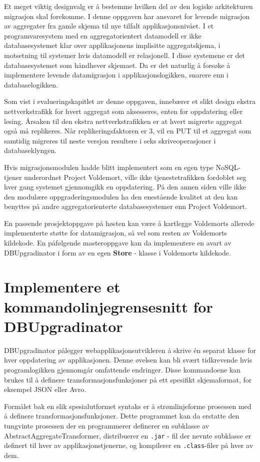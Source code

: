 Et meget viktig designvalg er å bestemme hvilken del av den logiske arkitekturen migrasjon skal forekomme. I denne oppgaven har ansvaret for levende migrasjon av aggregater fra gamle skjema til nye tilfalt applikasjonsnivået. I et programvaresystem med en aggregatorientert datamodell er ikke databasesystemet klar over applikasjonens implisitte aggregatskjema, i motsetning til systemer hvis datamodell er relasjonell. I disse systemene er det databasesystemet som håndhever skjemaet. Da er det naturlig å forsøke å implementere levende datamigrasjon i applikasjonslogikken, snarere enn i databaselogikken.

Som vist i evalueringskapitlet av denne oppgaven, innebærer et slikt design ekstra nettverkstrafikk for hvert aggregat som aksesseres, enten for oppdatering eller lesing. Årsaken til den ekstra nettverkstrafikken er at hvert migrerte aggregat også må replikeres. Når replikeringsfaktoren er 3, vil en PUT til et aggregat som samtidig migreres til neste versjon resultere i seks skriveoperasjoner i databaseklyngen.

Hvis migrasjonsmodulen hadde blitt implementert som en egen type NoSQL-tjener underordnet Project Voldemort, ville ikke tjenestetrafikken fordoblet seg hver gang systemet gjennomgikk en oppdatering. På den annen siden ville ikke den modulære oppgraderingsmodulen ha den enestående kvalitet at den kan benyttes på andre aggregatorienterte databasesystemer enn Project Voldemort.

En passende prosjektoppgave på høsten kan være å kartlegge Voldemorts allerede implementerte støtte for datamigrasjon, så vel som resten av Voldemorts kildekode. En påfølgende masteroppgave kan da implementere en avart av DBUpgradinator i form av en egen \textbf{Store} - klasse i Voldemorts kildekode.

\section{Implementere et kommandolinjegrensesnitt for DBUpgradinator}

DBUpgradinator pålegger webapplikasjonsutvikleren å skrive én separat klasse for hver oppdatering av applikasjonen. Denne øvelsen kan bli svært tidkrevende hvis programlogikken gjennomgår omfattende endringer. Disse kommandoene kan brukes til å definere transformasjonsfunksjoner på ett spesifikt skjemaformat, for eksempel JSON eller Avro.

Formålet bak en slik spesialutformet syntaks er å strømlinjeforme prosessen med å definere transformasjonsfunksjoner. Dette programmet kan da erstatte den tungvinte prosessen der en programmerer definerer en subklasse av AbstractAggregateTransformer, distribuerer en \texttt{.jar} - fil der nevnte subklasse er definert til hver av applikasjonstjenerne, og kompilerer en \texttt{.class}-filer på hver av dem. 

